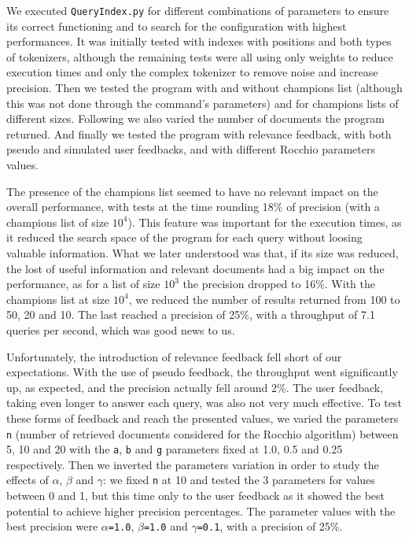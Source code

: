 \documentclass[12pt]{article}
\begin{document}
\newpage
We executed \texttt{QueryIndex.py} for different combinations of parameters to
ensure its correct functioning and to search for the configuration with highest 
performances.
It was initially tested with indexes with positions and both types of tokenizers, 
although the remaining tests were all using only weights to reduce execution times
and only the complex tokenizer to remove noise and increase precision.
Then we tested the program with and without champions list (although this was
not done through the command's parameters) and for champions lists of different sizes.
Following we also varied the number of documents the program returned.
And finally we tested the program with relevance feedback, with both pseudo and
simulated user feedbacks, and with different Rocchio parameters values.

The presence of the champions list seemed to have no relevant impact on the 
overall performance, with tests at the time rounding 18\% of precision
(with a champions list of size $10^4$).
This feature was important for the execution times, as it reduced the search 
space of the program for each query without loosing valuable information.
What we later understood was that, if its size was reduced, the lost of useful
information and relevant documents had a big impact on the performance,
as for a list of size $10^3$ the precision dropped to 16\%.
With the champions list at size $10^4$, we reduced the number of results
returned from 100 to 50, 20 and 10. 
The last reached a precision of 25\%, with a throughput of 7.1
queries per second, which was good news to us.

Unfortunately, the introduction of relevance feedback fell short of our expectations.
With the use of pseudo feedback, the throughput went significantly up, as expected,
and the precision actually fell around 2\%.
The user feedback, taking even longer to answer each query, was also not very
much effective.
To test these forms of feedback and reach the presented values, we varied the 
parameters \texttt{n} (number of retrieved documents considered for the Rocchio 
algorithm) between 5, 10 and 20 with the \texttt{a}, \texttt{b} and \texttt{g} 
parameters fixed at 1.0, 0.5 and 0.25 respectively.
Then we inverted the parameters variation in order to study the effects of 
$\alpha$, $\beta$ and $\gamma$: we fixed \texttt{n} at 10 and tested the 3 
parameters for values between 0 and 1, but this time only to the user feedback 
as it showed the best  potential to achieve higher precision percentages.
The parameter values with the best precision were \texttt{$\alpha$=1.0}, 
\texttt{$\beta$=1.0} and \texttt{$\gamma$=0.1}, with a precision of 25\%.
\end{document}
